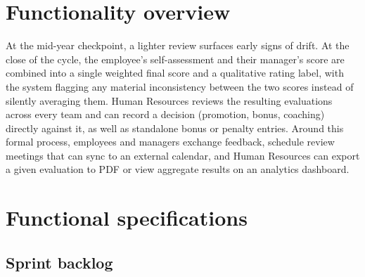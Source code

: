 \documentclass[12pt,a4paper]{report}
\begin{document}
\section{Functionality overview}

At the mid-year checkpoint, a lighter review surfaces early signs of drift. At the close of the cycle, the employee's self-assessment and their manager's score are combined into a single weighted final score and a qualitative rating label, with the system flagging any material inconsistency between the two scores instead of silently averaging them. Human Resources reviews the resulting evaluations across every team and can record a decision (promotion, bonus, coaching) directly against it, as well as standalone bonus or penalty entries. Around this formal process, employees and managers exchange feedback, schedule review meetings that can sync to an external calendar, and Human Resources can export a given evaluation to PDF or view aggregate results on an analytics dashboard.

\section{Functional specifications}

\subsection{Sprint backlog}
\end{document}
